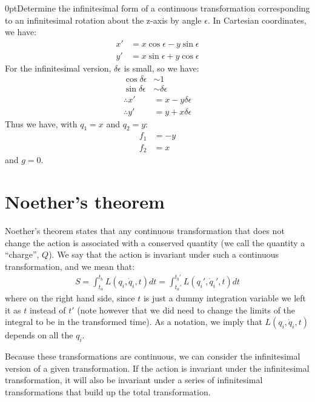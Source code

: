 \begin{example}{0pt}{Determine the infinitesimal form of a continuous transformation corresponding to an infinitesimal rotation about the z-axis by angle $\epsilon$.}{}
In Cartesian coordinates, we have:
\begin{align*}
x'&=x\cos\epsilon -y\sin\epsilon\\
y'&=x\sin\epsilon +y\cos\epsilon
\end{align*}
For the infinitesimal version, $\delta\epsilon$ is small, so we have:
\begin{align*}
\cos\delta\epsilon &\sim 1\\
\sin\delta\epsilon &\sim \delta\epsilon\\
\therefore x'&=x-y\delta\epsilon\\
\therefore y'&=y+x\delta\epsilon
\end{align*}
Thus we have, with $q_1=x$ and $q_2=y$:
\begin{align*}
f_1&=-y\\
f_2&=x
\end{align*}
and $g=0$.
\label{ex:zrotation}
\end{example}

\section{Noether's theorem}
Noether's theorem states that any continuous transformation that does not change the action is associated with a conserved quantity (we call the quantity a ``charge'', $Q$). We say that the action is invariant under such a continuous transformation, and we mean that:
\begin{align}
S=\int_{t_a}^{t_b}L(q_i,\dot{q}_i,t)dt=\int_{t_a'}^{t_b'}L(q_i',\dot{q}_i',t)dt
\end{align}
where on the right hand side, since $t$ is just a dummy integration variable we left it as $t$ instead of $t'$ (note however that we did need to change the limits of the integral to be in the transformed time). As a notation, we imply that $L(q_i,\dot{q}_i,t)$ depends on all the $q_i$. 
 
Because these transformations are continuous, we can consider the infinitesimal version of a given transformation. If the action is invariant under the infinitesimal transformation, it will also be invariant under a series of infinitesimal transformations that build up the total transformation.

